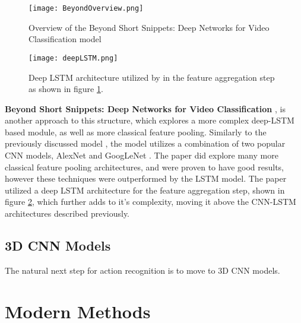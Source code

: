\begin{figure}[t]
	\texttt{[image: BeyondOverview.png]}
	\centering
	\caption{Overview of the Beyond Short Snippets: Deep Networks for Video Classification model \cite{beyondshortsnippets}}
	\label{fig:beyondoverview}
\end{figure}

\begin{figure}[t]
	\texttt{[image: deepLSTM.png]}
	\centering
	\caption{Deep LSTM architecture utilized by \cite{beyondshortsnippets} in the feature aggregation step as shown in figure \ref{fig:beyondoverview}.}
	\label{fig:deeplstm}
\end{figure}

\textbf{Beyond Short Snippets: Deep Networks for Video Classification} \cite{beyondshortsnippets}, is another approach to this structure, which explores a more complex deep-LSTM based module, as well as more classical feature pooling. Similarly to the previously discussed model \cite{LRCNS}, the model utilizes a combination of two popular CNN models, AlexNet \cite{alexnet} and GoogLeNet \cite{googlenet}. The paper did explore many more classical feature pooling architectures, and were proven to have good results, however these techniques were outperformed by the LSTM model. The paper utilized a deep LSTM architecture for the feature aggregation step, shown in figure \ref{fig:deeplstm}, which further adds to it's complexity, moving it above the CNN-LSTM architectures described previously. 

\subsection{3D CNN Models}

The natural next step for action recognition is to move to 3D CNN models.

\section{Modern Methods}

